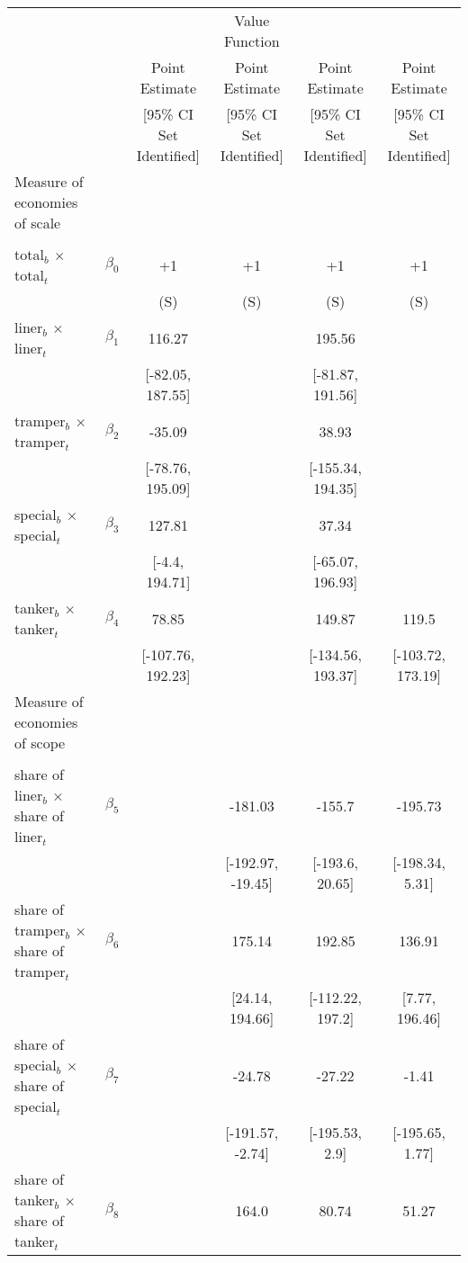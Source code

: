 \begin{tabular}{@{\extracolsep{5pt}}lccccc}
\toprule 
 &  &  & Value Function &  &  \\
 &  & Point Estimate & Point Estimate & Point Estimate & Point Estimate \\
 &  & [95\% CI Set Identified] & [95\% CI Set Identified] & [95\% CI Set Identified] & [95\% CI Set Identified] \\
\midrule 
Measure of economies of scale &  &  &  &  &  \\
 &  &  &  &  \\
total$_{b}$ $\times$ total$_{t}$ & $\beta_0$ & +1 & +1 & +1 & +1 \\
 &  & (S) & (S) & (S) & (S) \\
liner$_{b}$ $\times$ liner$_{t}$ & $\beta_1$ & 116.27 &  & 195.56 &  \\
 &  & [-82.05, 187.55] &  & [-81.87, 191.56] &  \\
tramper$_{b}$ $\times$ tramper$_{t}$ & $\beta_2$ & -35.09 &  & 38.93 &  \\
 &  & [-78.76, 195.09] &  & [-155.34, 194.35] &  \\
special$_{b}$ $\times$ special$_{t}$ & $\beta_3$ & 127.81 &  & 37.34 &  \\
 &  & [-4.4, 194.71] &  & [-65.07, 196.93] &  \\
tanker$_{b}$ $\times$ tanker$_{t}$ & $\beta_4$ & 78.85 &  & 149.87 & 119.5 \\
 &  & [-107.76, 192.23] &  & [-134.56, 193.37] & [-103.72, 173.19] \\
Measure of economies of scope &  &  &  &  &  \\
 &  &  &  &  &  \\
share of liner$_{b}$ $\times$ share of liner$_{t}$ & $\beta_5$ &  & -181.03 & -155.7 & -195.73 \\
 &  &  & [-192.97, -19.45] & [-193.6, 20.65] & [-198.34, 5.31] \\
share of tramper$_{b}$ $\times$ share of tramper$_{t}$ & $\beta_6$ &  & 175.14 & 192.85 & 136.91 \\
 &  &  & [24.14, 194.66] & [-112.22, 197.2] & [7.77, 196.46] \\
share of special$_{b}$ $\times$ share of special$_{t}$ & $\beta_7$ &  & -24.78 & -27.22 & -1.41 \\
 &  &  & [-191.57, -2.74] & [-195.53, 2.9] & [-195.65, 1.77] \\
share of tanker$_{b}$ $\times$ share of tanker$_{t}$ & $\beta_8$ &  & 164.0 & 80.74 & 51.27 \\

\end{tabular}
